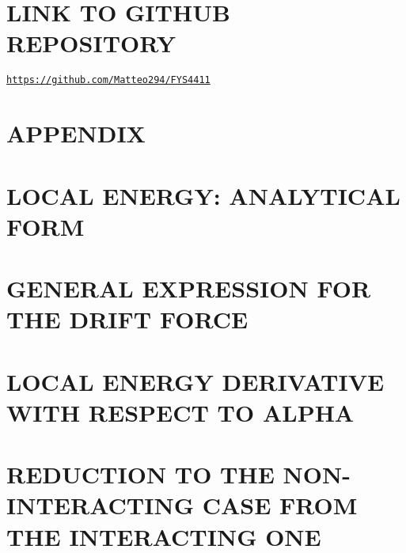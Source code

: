 \documentclass[a4paper, twocolumn]{article}
\begin{document}
\section*{LINK TO GITHUB REPOSITORY}
\centering
\href{https://github.com/Matteo294/FYS4411}{\texttt{https://github.com/Matteo294/FYS4411}}

\clearpage
\section*{APPENDIX}
\appendix
\section{LOCAL ENERGY: ANALYTICAL FORM}
\label{appendix:local_energy}


\section{GENERAL EXPRESSION FOR THE DRIFT FORCE}
\label{appendix:drift_force_general}

\section{LOCAL ENERGY DERIVATIVE WITH RESPECT TO ALPHA}
\label{appendix:local_energy_derivative}

\section{REDUCTION TO THE NON-INTERACTING CASE FROM THE INTERACTING ONE}
\label{appendix:interacting_reduced_as_non_interacting}


\newpage
\twocolumn[{
\begin{multicols}{2}
\printbibliography
\end{multicols}
}]
\end{document}
